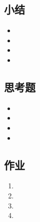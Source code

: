 \documentclass{article}
\begin{document}
\begin{CJK}{UTF8}{gkai}
\subsection{}

\subsection{小结}
\begin{itemize}
\item
\item
\item
\item 
\end{itemize}

\subsection{思考题}
\begin{itemize}
\item
\item
\item
\item 
\end{itemize}

\subsection{作业}
\begin{enumerate}
\item 
\item
\item
\item
\end{enumerate}



\end{CJK}
\end{document}
